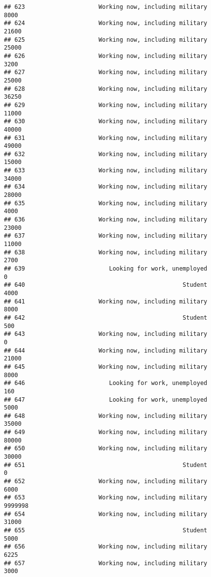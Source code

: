 \documentclass[]{book}
\theoremstyle{definition}
\theoremstyle{definition}
\theoremstyle{remark}
\begin{document}
\begin{verbatim}
## 623                     Working now, including military            8000
## 624                     Working now, including military           21600
## 625                     Working now, including military           25000
## 626                     Working now, including military            3200
## 627                     Working now, including military           25000
## 628                     Working now, including military           36250
## 629                     Working now, including military           11000
## 630                     Working now, including military           40000
## 631                     Working now, including military           49000
## 632                     Working now, including military           15000
## 633                     Working now, including military           34000
## 634                     Working now, including military           28000
## 635                     Working now, including military            4000
## 636                     Working now, including military           23000
## 637                     Working now, including military           11000
## 638                     Working now, including military            2700
## 639                        Looking for work, unemployed               0
## 640                                             Student            4000
## 641                     Working now, including military            8000
## 642                                             Student             500
## 643                     Working now, including military               0
## 644                     Working now, including military           21000
## 645                     Working now, including military            8000
## 646                        Looking for work, unemployed             160
## 647                        Looking for work, unemployed            5000
## 648                     Working now, including military           35000
## 649                     Working now, including military           80000
## 650                     Working now, including military           30000
## 651                                             Student               0
## 652                     Working now, including military            6000
## 653                     Working now, including military         9999998
## 654                     Working now, including military           31000
## 655                                             Student            5000
## 656                     Working now, including military            6225
## 657                     Working now, including military            3000

\end{verbatim}
\end{document}
